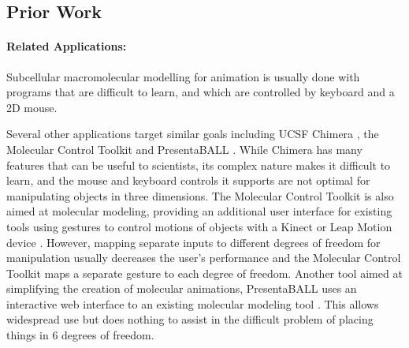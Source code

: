 \documentclass[twocolumn]{bmcart}%
\begin{document}
\subsection*{Prior Work}
\paragraph*{Related Applications:}

Subcellular macromolecular modelling for animation is usually done with programs that are difficult to learn, and which are controlled by keyboard and a 2D mouse.

Several other applications target similar goals including UCSF Chimera \cite{pettersen2004ucsf}, the Molecular Control Toolkit \cite{sabirmolecular} and PresentaBALL \cite{nickelspresentaball}.  While Chimera has many features that can be useful to scientists, its complex nature makes it difficult to learn, and the mouse and keyboard controls it supports are not optimal for manipulating objects in three dimensions.  The Molecular Control Toolkit is also aimed at molecular modeling, providing an additional user interface for existing tools using gestures to control motions of objects with a Kinect or Leap Motion device \cite{sabirmolecular}.  However, mapping separate inputs to different degrees of freedom for manipulation usually decreases the user's performance\cite{bowman20043d} and the Molecular Control Toolkit maps a separate gesture to each degree of freedom.  Another tool aimed at simplifying the creation of molecular animations, PresentaBALL uses an interactive web interface to an existing molecular modeling tool \cite{nickelspresentaball}.  This allows widespread use but does nothing to assist in the difficult problem of placing things in 6 degrees of freedom.

\end{document}
